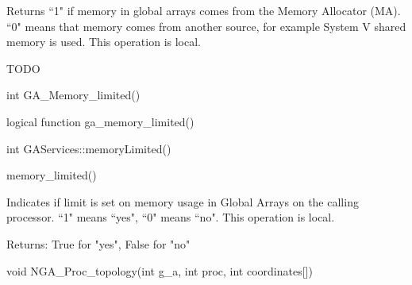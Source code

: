 \documentclass[12pt]{article}
\begin{document}
\begin{desc}

Returns ``1" if memory in global arrays comes from the Memory Allocator (MA). 
``0" means that memory comes from another source, for example System V shared 
memory is used.
This operation is local.

TODO
\end{desc}


\begin{capi}
\begin{ccode}
int GA_Memory_limited()
\end{ccode}
\end{capi}

\begin{fapi}
\begin{fcode}
logical function ga_memory_limited()
\end{fcode}
\end{fapi}

\begin{cxxapi}
\begin{cxxcode}
int GAServices::memoryLimited()
\end{cxxcode}
\end{cxxapi}

\begin{pyapi}
\begin{pycode}
memory_limited() 
\end{pycode}
\end{pyapi}

\begin{desc}

Indicates if limit is set on memory usage in Global Arrays on the calling processor. 
``1" means ``yes", ``0" means ``no".
This operation is local.

Returns: 
True for "yes", False for "no"
\end{desc}


\begin{capi}
\begin{ccode}
void NGA_Proc_topology(int g_a, int proc, int coordinates[])
\end{ccode}
\begin{funcargs}
\end{funcargs}
\end{capi}
\end{document}
